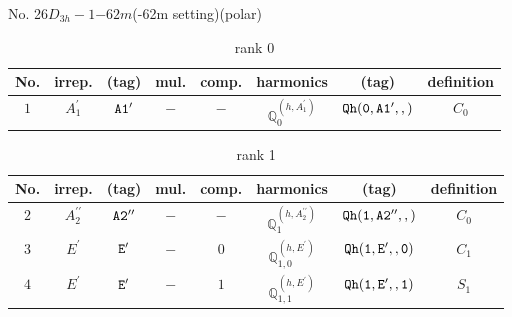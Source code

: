 \documentclass[fleqn,8pt]{jsarticle}
\begin{document}
\setcounter{MaxMatrixCols}{16}

\begin{center}
\LARGE
No. 26\quad$D_{3h}-1$\quad$-62m$\quad(-62m setting)\quad[ hexagonal ] (polar)
\end{center}
\begin{table}[ht!]
\begin{center}
\caption{rank 0}
\renewcommand{\arraystretch}{1.3}
\begin{tabular}{cccccccc} \hline \hline
No. & irrep. & (tag) & mul. & comp. & harmonics & (tag) & definition \\ \hline
$ 1 $ & $ A_{1}^{\prime} $ & $ {\tt A1'} $ & $ - $ & $ - $ & $ \mathbb{Q}_{0}^{(h,A_{1}^{\prime})} $ & $ {\tt Qh(0,A1',,)} $ & $ C_{0} $ \\
 \hline \hline
\end{tabular}
\end{center}
\end{table}
\begin{table}[ht!]
\begin{center}
\caption{rank 1}
\renewcommand{\arraystretch}{1.3}
\begin{tabular}{cccccccc} \hline \hline
No. & irrep. & (tag) & mul. & comp. & harmonics & (tag) & definition \\ \hline
$ 2 $ & $ A_{2}^{\prime\prime} $ & $ {\tt A2''} $ & $ - $ & $ - $ & $ \mathbb{Q}_{1}^{(h,A_{2}^{\prime\prime})} $ & $ {\tt Qh(1,A2'',,)} $ & $ C_{0} $ \\
$ 3 $ & $ E^{\prime} $ & $ {\tt E'} $ & $ - $ & $ 0 $ & $ \mathbb{Q}_{1,0}^{(h,E^{\prime})} $ & $ {\tt Qh(1,E',,0)} $ & $ C_{1} $ \\
$ 4 $ & $ E^{\prime} $ & $ {\tt E'} $ & $ - $ & $ 1 $ & $ \mathbb{Q}_{1,1}^{(h,E^{\prime})} $ & $ {\tt Qh(1,E',,1)} $ & $ S_{1} $ \\
 \hline \hline
\end{tabular}
\end{center}
\end{table}
\end{document}
